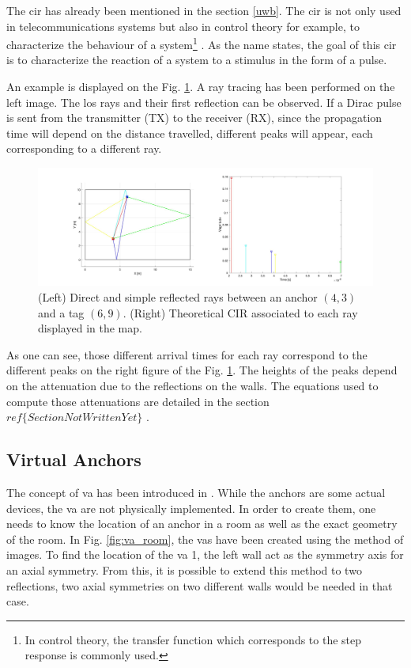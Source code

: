 The \gls{cir} has already been mentioned in the section \ref{uwb}. The \gls{cir} is not only used in telecommunications systems but also in control theory for example, to characterize the behaviour of a system\footnote{In control theory, the transfer function which corresponds to the step response is commonly used.} \cite{garonne2019course}. As the name states, the goal of this \gls{cir} is to characterize the reaction of a system to a stimulus in the form of a pulse.
\vspace{2mm}

An example is displayed on the Fig. \ref{fig:cir_ex1}. A ray tracing has been performed on the left image. The \gls{los} rays and their first reflection can be observed. If a Dirac pulse is sent from the transmitter (TX) to the receiver (RX), since the propagation time will depend on the distance travelled, different peaks will appear, each corresponding to a different ray.

\begin{figure}[H]
	\centering
	\includegraphics[width=1\linewidth]{Images/Anchor-mpc.jpg}
	\caption{(Left) Direct and simple reflected rays between an anchor $(4, 3)$ and a tag $(6, 9)$. (Right) Theoretical CIR associated to each ray displayed in the map. 	\label{fig:cir_ex1}}

\end{figure}

As one can see, those different arrival times for each ray correspond to the different peaks on the right figure of the Fig. \ref{fig:cir_ex1}. The heights of the peaks depend on the attenuation due to the reflections on the walls. The equations used to compute those attenuations are detailed in the section \color{red} $ref\{SectionNotWrittenYet\}$ \color{black}. 

\subsection{Virtual Anchors}

The concept of \gls{va} has been introduced in  \cite{meissner2010uwb}. While the anchors are some actual devices, the \gls{va} are not physically implemented. In order to create them, one needs to know the location of an anchor in a room as well as the exact geometry of the room. In Fig. \ref{fig:va_room}, the \glspl{va} have been created using the method of images. To find the location of the \gls{va} 1, the left wall act as the symmetry axis for an axial symmetry. From this, it is possible to extend this method to two reflections, two axial symmetries on two different walls would be needed in that case.

